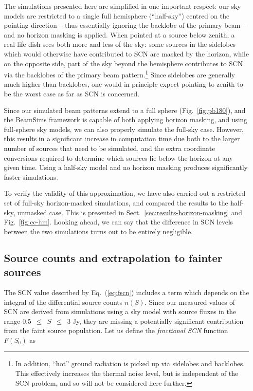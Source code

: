 \documentclass{aa}
\begin{document}
The simulations presented here are simplified in one important respect: our sky models are restricted to a single full hemisphere (``half-sky'') centred on the pointing direction -- thus essentially ignoring the backlobe of the primary beam -- and no horizon masking is applied. When pointed at a source below zenith, a real-life dish sees both more and less of the sky: some sources in the sidelobes which would otherwise have contributed to SCN are masked by the horizon, while on the opposite side, part of the sky beyond the hemisphere contributes to SCN via the backlobes of the primary beam pattern.\footnote{In addition, ``hot'' ground radiation is picked up via sidelobes and backlobes. This effectively increases the thermal noise level, but is independent of the SCN problem, and so will not be considered here further.} Since sidelobes are generally much higher than backlobes, one would in principle expect pointing to zenith to be the worst case as far as SCN is concerned. 

Since our simulated beam patterns extend to a full sphere (Fig.~\ref{fig:pb180}), and the BeamSims framework is capable of both applying horizon masking, and using full-sphere sky models, we can also properly simulate the full-sky case. However, this results in a significant increase in computation time due both to the larger number of sources that need to be simulated, and the extra coordinate conversions required to determine which sources lie below the horizon at any given time. Using a half-sky model and no horizon masking produces significantly faster simulations. 

To verify the validity of this approximation, we have also carried out a restricted set of full-sky horizon-masked simulations, and compared the results to the half-sky, unmasked case. This is presented in Sect.~\ref{sec:results-horizon-masking} and Fig.~\ref{fig:cc-hm}. Looking ahead, we can say that the difference in SCN levels between the two simulations turns out to be entirely negligible.

\subsection{Source counts and extrapolation to fainter sources}
\label{sec:source-counts}

The SCN value described by Eq.~(\ref{eq:fscn}) includes a term which depends on the integral of the differential source counts $n(S)$. Since our measured values of SCN are derived from simulations using a sky model with source fluxes in the range 0.5~$\leq$~$S$~$\leq$~3 Jy, they are missing a potentially significant contribution from the faint source population. Let us define the {\em fractional SCN} function $F(S_0)$ as
\end{document}
